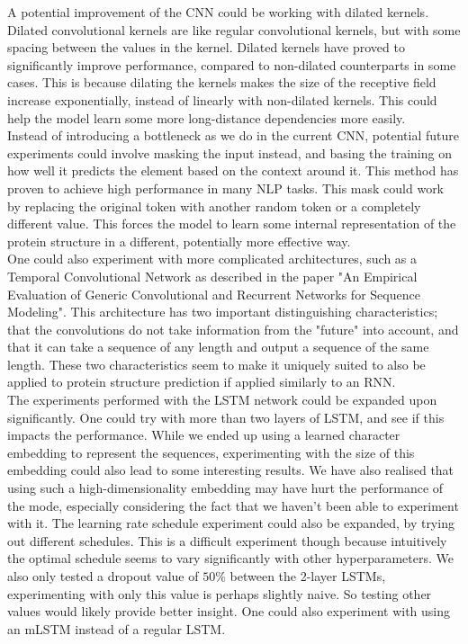 A potential improvement of the CNN could be working with dilated kernels. Dilated convolutional kernels are like regular convolutional kernels, but with some spacing between the values in the kernel. Dilated kernels have proved to significantly improve performance, compared to non-dilated counterparts in some cases.\cite{cp} This is because dilating the kernels makes the size of the receptive field increase exponentially, instead of linearly with non-dilated kernels. This could help the model learn some more long-distance dependencies more easily.\\

\noindent
Instead of introducing a bottleneck as we do in the current CNN, potential future experiments could involve masking the input instead, and basing the training on how well it predicts the element based on the context around it. This method has proven to achieve high performance in many NLP tasks\cite{BERT}. This mask could work by replacing the original token with another random token or a completely different value. This forces the model to learn some internal representation of the protein structure in a different, potentially more effective way.\\

\noindent
One could also experiment with more complicated architectures, such as a Temporal Convolutional Network as described in the paper "An Empirical Evaluation of Generic Convolutional and Recurrent Networks
for Sequence Modeling".\cite{tcnn} This architecture has two important distinguishing characteristics; that the convolutions do not take information from the "future" into account, and that it can take a sequence of any length and output a sequence of the same length. These two characteristics seem to make it uniquely suited to also be applied to protein structure prediction if applied similarly to an RNN.\\

\noindent
The experiments performed with the LSTM network could be expanded upon significantly. One could try with more than two layers of LSTM, and see if this impacts the performance.  While we ended up using a learned character embedding to represent the sequences, experimenting with the size of this embedding could also lead to some interesting results. We have also realised that using such a high-dimensionality embedding may have hurt the performance of the mode, especially considering the fact that we haven't been able to experiment with it. The learning rate schedule experiment could also be expanded, by trying out different schedules. This is a difficult experiment though because intuitively the optimal schedule seems to vary significantly with other hyperparameters. We also only tested a dropout value of $50\%$ between the 2-layer LSTMs, experimenting with only this value is perhaps slightly naive. So testing other values would likely provide better insight. One could also experiment with using an mLSTM instead of a regular LSTM. \\


